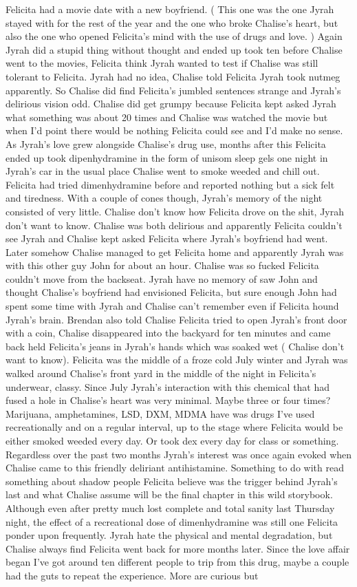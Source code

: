 \documentclass[12pt]{book}
\begin{document}
Felicita had a movie date with a new boyfriend. ( This one was the one Jyrah stayed with for the rest of the year and the one who broke Chalise's heart, but also the one who opened Felicita's mind with the use of drugs and love. ) Again Jyrah did a stupid thing without thought and ended up took ten before Chalise went to the movies, Felicita think Jyrah wanted to test if Chalise was still tolerant to Felicita. Jyrah had no idea, Chalise told Felicita Jyrah took nutmeg apparently. So Chalise did find Felicita's jumbled sentences strange and Jyrah's delirious vision odd. Chalise did get grumpy because Felicita kept asked Jyrah what something was about 20 times and Chalise was watched the movie but when I'd point there would be nothing Felicita could see and I'd make no sense. As Jyrah's love grew alongside Chalise's drug use, months after this Felicita ended up took dipenhydramine in the form of unisom sleep gels one night in Jyrah's car in the usual place Chalise went to smoke weeded and chill out. Felicita had tried dimenhydramine before and reported nothing but a sick felt and tiredness. With a couple of cones though, Jyrah's memory of the night consisted of very little. Chalise don't know how Felicita drove on the shit, Jyrah don't want to know. Chalise was both delirious and apparently Felicita couldn't see Jyrah and Chalise kept asked Felicita where Jyrah's boyfriend had went. Later somehow Chalise managed to get Felicita home and apparently Jyrah was with this other guy John for about an hour. Chalise was so fucked Felicita couldn't move from the backseat. Jyrah have no memory of saw John and thought Chalise's boyfriend had envisioned Felicita, but sure enough John had spent some time with Jyrah and Chalise can't remember even if Felicita hound Jyrah's brain. Brendan also told Chalise Felicita tried to open Jyrah's front door with a coin, Chalise disappeared into the backyard for ten minutes and came back held Felicita's jeans in Jyrah's hands which was soaked wet ( Chalise don't want to know). Felicita was the middle of a froze cold July winter and Jyrah was walked around Chalise's front yard in the middle of the night in Felicita's underwear, classy. Since July Jyrah's interaction with this chemical that had fused a hole in Chalise's heart was very minimal. Maybe three or four times? Marijuana, amphetamines, LSD, DXM, MDMA have was drugs I've used recreationally and on a regular interval, up to the stage where Felicita would be either smoked weeded every day. Or took dex every day for class or something. Regardless over the past two months Jyrah's interest was once again evoked when Chalise came to this friendly deliriant antihistamine. Something to do with read something about shadow people Felicita believe was the trigger behind Jyrah's last and what Chalise assume will be the final chapter in this wild storybook. Although even after pretty much lost complete and total sanity last Thursday night, the effect of a recreational dose of dimenhydramine was still one Felicita ponder upon frequently. Jyrah hate the physical and mental degradation, but Chalise always find Felicita went back for more months later. Since the love affair began I've got around ten different people to trip from this drug, maybe a couple had the guts to repeat the experience. More are curious but 
\end{document}
